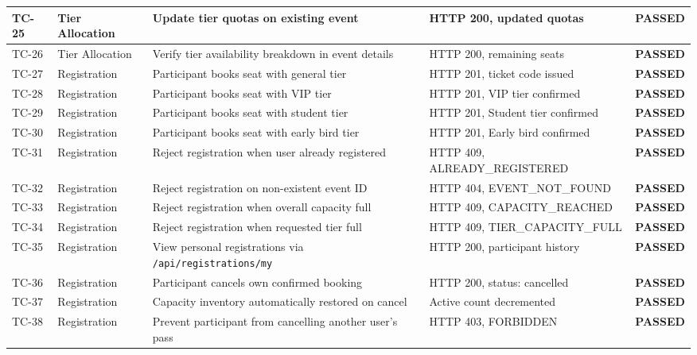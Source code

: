 \documentclass[11pt,a4paper]{report}
\begin{document}
\begin{table}[H]
\begin{tabularx}{\textwidth}{|p{}|p{}|p{}|p{}|X|}
TC-25 & Tier Allocation & Update tier quotas on existing event & HTTP 200, updated quotas & \color{SuccessGreen}\textbf{PASSED} \\\hline
TC-26 & Tier Allocation & Verify tier availability breakdown in event details & HTTP 200, remaining seats & \color{SuccessGreen}\textbf{PASSED} \\\hline
TC-27 & Registration & Participant books seat with general tier & HTTP 201, ticket code issued & \color{SuccessGreen}\textbf{PASSED} \\\hline
TC-28 & Registration & Participant books seat with VIP tier & HTTP 201, VIP tier confirmed & \color{SuccessGreen}\textbf{PASSED} \\\hline
TC-29 & Registration & Participant books seat with student tier & HTTP 201, Student tier confirmed & \color{SuccessGreen}\textbf{PASSED} \\\hline
TC-30 & Registration & Participant books seat with early bird tier & HTTP 201, Early bird confirmed & \color{SuccessGreen}\textbf{PASSED} \\\hline
TC-31 & Registration & Reject registration when user already registered & HTTP 409, ALREADY\_REGISTERED & \color{SuccessGreen}\textbf{PASSED} \\\hline
TC-32 & Registration & Reject registration on non-existent event ID & HTTP 404, EVENT\_NOT\_FOUND & \color{SuccessGreen}\textbf{PASSED} \\\hline
TC-33 & Registration & Reject registration when overall capacity full & HTTP 409, CAPACITY\_REACHED & \color{SuccessGreen}\textbf{PASSED} \\\hline
TC-34 & Registration & Reject registration when requested tier full & HTTP 409, TIER\_CAPACITY\_FULL & \color{SuccessGreen}\textbf{PASSED} \\\hline
TC-35 & Registration & View personal registrations via \texttt{/api/registrations/my} & HTTP 200, participant history & \color{SuccessGreen}\textbf{PASSED} \\\hline
TC-36 & Registration & Participant cancels own confirmed booking & HTTP 200, status: cancelled & \color{SuccessGreen}\textbf{PASSED} \\\hline
TC-37 & Registration & Capacity inventory automatically restored on cancel & Active count decremented & \color{SuccessGreen}\textbf{PASSED} \\\hline
TC-38 & Registration & Prevent participant from cancelling another user's pass & HTTP 403, FORBIDDEN & \color{SuccessGreen}\textbf{PASSED} \\\hline

\end{tabularx}
\end{table}
\end{document}
